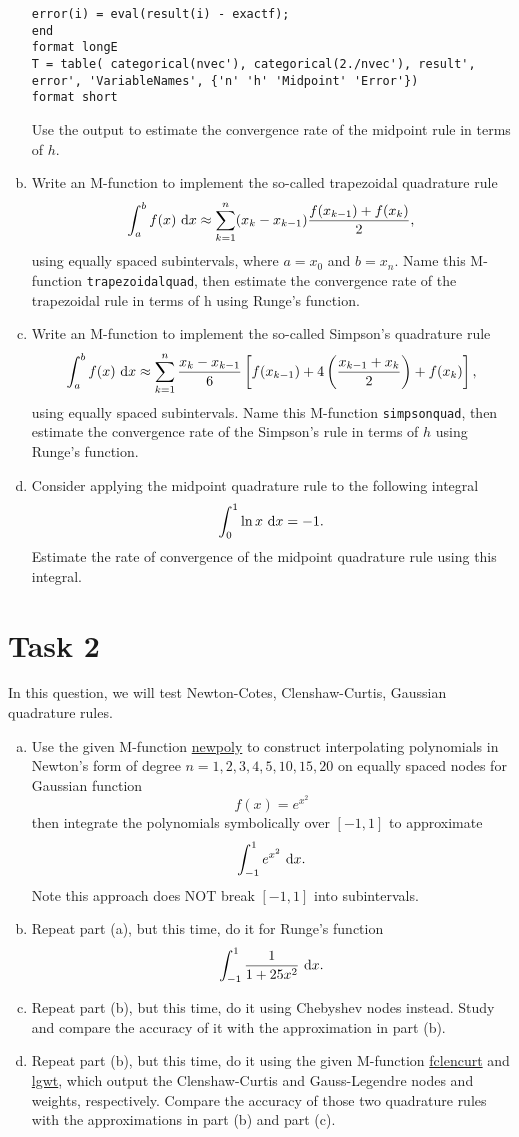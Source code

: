 \begin{enumerate}[(a)]
\begin{lstlisting}[style=Matlab-editor]
	error(i) = eval(result(i) - exactf);
end
format longE
T = table( categorical(nvec'), categorical(2./nvec'), result', error', 'VariableNames', {'n' 'h' 'Midpoint' 'Error'})
format short
	\end{lstlisting}
	Use the output to estimate the convergence rate of the midpoint rule in terms of \(h\).
	\item Write an M-function to implement the so-called trapezoidal quadrature rule
	\[ \int_{a}^{b}f(x)~\mathrm{d} x\approx \sum_{k=1}^n(x_k-x_{k-1})\frac{f(x_{k-1})+f(x_k)}{2}, \]
	using equally spaced subintervals, where \(a=x_0\) and \(b=x_n\).
	Name this M-function \texttt{trapezoidalquad}, then estimate the convergence rate of the trapezoidal rule in terms of h using Runge's function.
	\item Write an M-function to implement the so-called Simpson's quadrature rule
	\[ \int_{a}^{b}f(x)~\mathrm{d} x\approx \sum_{k=1}^n\frac{x_k-x_{k-1}}{6}\left[ f(x_{k-1})+4\left(\frac{x_{k-1}+x_k}{2}\right)+f(x_k)\right], \]
	using equally spaced subintervals.
	Name this M-function \texttt{simpsonquad}, then estimate the convergence rate of the Simpson's rule in terms of \(h\) using Runge's function.
	\item Consider applying the midpoint quadrature rule to the following integral
	\[ \int_0^1\ln x~\mathrm{d} x=-1. \]
	Estimate the rate of convergence of the midpoint quadrature rule using this integral.
\end{enumerate}


\section*{Task 2}
In this question, we will test Newton-Cotes, Clenshaw-Curtis, Gaussian quadrature rules.
\begin{enumerate}[(a)]
	\item Use the given M-function \hyperref[newpoly]{newpoly} to construct interpolating polynomials in Newton's form of degree \(n=1,2,3,4,5,10,15,20\) on equally spaced nodes for Gaussian function
	\[ f(x)=e^{x^2} \]
	then integrate the polynomials symbolically over \([-1, 1]\) to approximate
	\[ \int_{-1}^{1}e^{x^2}~\mathrm{d} x. \]
	Note this approach does NOT break \([-1, 1]\) into subintervals.
	\item Repeat part (a), but this time, do it for Runge's function
	\[ \int_{-1}^{1}\frac{1}{1+25x^2}~\mathrm{d} x. \]
	\item Repeat part (b), but this time, do it using Chebyshev nodes instead.
	Study and compare the accuracy of it with the approximation in part (b).
	\item Repeat part (b), but this time, do it using the given M-function \hyperref[fclencurt]{fclencurt} 	and \hyperref[lgwt]{lgwt}, which output the Clenshaw-Curtis and Gauss-Legendre nodes and weights, respectively.
	Compare the accuracy of those two quadrature rules with the approximations in part (b) and part (c).
\end{enumerate}



